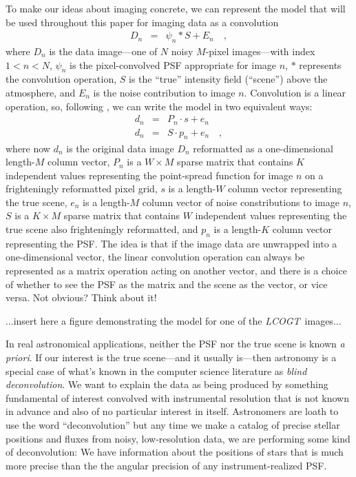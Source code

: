 \documentclass[12pt,preprint]{aastex}
\newcommand{\foreign}[1]{\textit{#1}}
\newcommand{\project}[1]{\textsl{#1}}
\newcommand{\LCOGT}{\project{LCOGT}}
\newcommand{\data}{D}
\newcommand{\scene}{S}
\newcommand{\psf}{\psi}
\begin{document}
To make our ideas about imaging concrete, we can represent the model
that will be used throughout this paper for imaging data as a
convolution
\begin{eqnarray}\displaystyle
\data_n &=& \psf_n \ast \scene + E_n
\quad ,
\end{eqnarray}
where $\data_n$ is the data image---one of $N$ noisy $M$-pixel
images---with index $1<n<N$, $\psf_n$ is the pixel-convolved PSF
appropriate for image $n$, $\ast$ represents the convolution
operation, $\scene$ is the ``true'' intensity field (``scene'') above
the atmosphere, and $E_n$ is the noise contribution to image $n$.
Convolution is a linear operation, so, following \citet{hirsch}, we
can write the model in two equivalent ways:
\begin{eqnarray}\displaystyle
d_n &=& P_n \cdot s + e_n
\\
d_n &=& S \cdot p_n + e_n
\quad ,
\end{eqnarray}
where now $d_n$ is the original data image $\data_n$ reformatted as a
one-dimensional length-$M$ column vector, $P_n$ is a $W\times M$
sparse matrix that contains $K$ independent values representing the
point-spread function for image $n$ on a frighteningly reformatted
pixel grid, $s$ is a length-$W$ column vector representing the true
scene, $e_n$ is a length-$M$ column vector of noise constributions to
image $n$, $\scene$ is a $K\times M$ sparse matrix that contains $W$
independent values representing the true scene also frighteningly
reformatted, and $p_n$ is a length-$K$ column vector representing the
PSF.  The idea is that if the image data are unwrapped into a
one-dimensional vector, the linear convolution operation can always be
represented as a matrix operation acting on another vector, and there
is a choice of whether to see the PSF as the matrix and the scene as
the vector, or vice versa.  Not obvious?  Think about it!

...insert here a figure demonstrating the model for one of the \LCOGT\ images...

In real astronomical applications, neither the PSF nor the true scene
is known \foreign{a priori}.  If our interest is the true scene---and
it usually is---then astronomy is a special case of what's known in
the computer science literature as \emph{blind deconvolution}.  We
want to explain the data as being produced by something fundamental of
interest convolved with instrumental resolution that is not known in
advance and also of no particular interest in itself.  Astronomers are
loath to use the word ``deconvolution'' but any time we make a catalog
of precise stellar positions and fluxes from noisy, low-resolution
data, we are performing some kind of deconvolution: We have
information about the positions of stars that is much more precise
than the the angular precision of any instrument-realized PSF.
\end{document}

